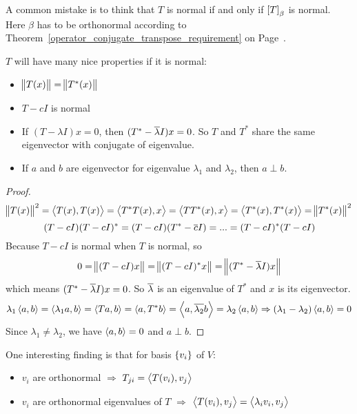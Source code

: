A common mistake is to think that $T$ is normal if and only if $\coordinate{T}_\beta$ is normal. Here $\beta$ has to be orthonormal according to Theorem~\ref{operator_conjugate_transpose_requirement} on Page~\pageref{operator_conjugate_transpose_requirement}.

$T$ will have many nice properties if it is normal:
\begin{itemize}
    \item $\norm{T(x)} = \norm{T^* (x)}$
    \item $T - cI$ is normal
    \item If $(T - \lambda I)x = 0$, then $(T^* - \overline{\lambda}I)x = 0$. So $T$ and $T^*$ share the same eigenvector with conjugate of eigenvalue.
    \item If $a$ and $b$ are eigenvector for eigenvalue $\lambda_1$ and $\lambda_2$, then $a \perp b$.
\end{itemize}
\begin{proof}
    \begin{equation*}
        \norm{T(x)}^2 = \left\langle \displaystyle T(x), T(x) \right\rangle = \left\langle \displaystyle T^*T(x), x \right\rangle = \left\langle \displaystyle TT^*(x), x \right\rangle = \left\langle \displaystyle T^*(x), T^*(x) \right\rangle = \norm{T^*(x)}^2
    \end{equation*}
    \begin{equation*}
        (T-cI)(T-cI)^* = (T-cI)(T^* - \overline{c}I) = ... = (T-cI)^*(T-cI)
    \end{equation*}
    Because $T-cI$ is normal when $T$ is normal, so
    \begin{equation*}
        0 = \norm{(T-cI)x} = \norm{(T-cI)^* x} =  \norm{(T^*- \overline{\lambda} I)x}
    \end{equation*}
    which means $(T^*- \overline{\lambda} I)x = 0$. So $\overline{\lambda}$ is an eigenvalue of $T^*$ and $x$ is its eigenvector.
    \begin{equation*}
        \lambda_1 \left\langle \displaystyle a, b \right\rangle = \left\langle \displaystyle \lambda_1 a, b \right\rangle = \left\langle \displaystyle Ta, b \right\rangle = \left\langle \displaystyle a, T^*b \right\rangle = \left\langle \displaystyle a, \overline{\lambda_2}b \right\rangle = \lambda_2 \left\langle \displaystyle a, b \right\rangle \Rightarrow (\lambda_1 - \lambda_2)\left\langle \displaystyle a, b \right\rangle = 0
    \end{equation*}
    Since $\lambda_1 \neq \lambda_2$, we have $\left\langle \displaystyle a, b \right\rangle = 0$ and $a \perp b$.
\end{proof}


One interesting finding is that for basis $\set{v_i}$ of $V$:
\begin{itemize}
    \item $v_i$ are orthonormal $\Rightarrow$ $T_{ji} = \left\langle \displaystyle T(v_i), v_j \right\rangle$
    \item $v_i$ are orthonormal eigenvalues of $T$ $\Rightarrow$ $\left\langle \displaystyle T(v_i), v_j \right\rangle = \left\langle \displaystyle \lambda_i v_i, v_j \right\rangle$
\end{itemize}


